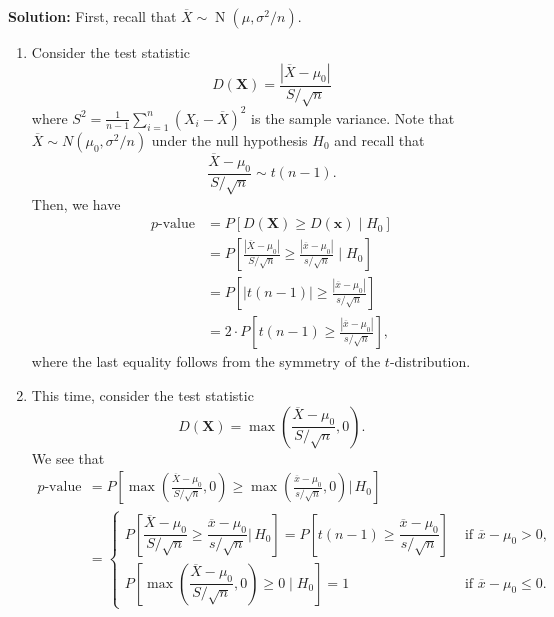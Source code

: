 \documentclass[10pt]{article}
\DeclareMathOperator{\Nor}{N}
\theoremstyle{newstyle}
\begin{document}
{\color{blue}
{\bf Solution:} First, recall that $\overline X \sim \Nor(\mu, \sigma^2/n)$. 
\begin{enumerate}[(1)]
    \item Consider the test statistic 
    \[ D(\mathbf X) = \frac{|\overline X - \mu_0|}{S/\sqrt n} \]
    where $S^2 = \frac1{n-1} \sum_{i=1}^n (X_i - \overline X)^2$ is the sample variance. 
    Note that $\overline X \sim N(\mu_0, \sigma^2/n)$ under the null hypothesis $H_0$ and 
    recall that 
    \[ \frac{\overline X - \mu_0}{S/\sqrt n} \sim t(n-1). \]
    Then, we have 
    \begin{align*}
        \text{$p$-value} 
        &= P[D(\mathbf X) \geq D(\mathbf x) \mid H_0] \\
        &= P \left[ \frac{|\overline X - \mu_0|}{S/\sqrt n} \geq 
        \frac{|\overline x - \mu_0|}{s/\sqrt n} \; \bigg| \; H_0 \right] \\
        &= P \left[ |t(n-1)| \geq \frac{|\overline x - \mu_0|}{s/\sqrt n} \right] \\
        &= 2 \cdot P \left[ t(n-1) \geq \frac{|\overline x - \mu_0|}{s/\sqrt n} \right],
    \end{align*}
    where the last equality follows from the symmetry of the $t$-distribution. 
    
    \item This time, consider the test statistic 
    \[ D(\mathbf X) = \max\left( \frac{\overline X - \mu_0}{S/\sqrt n}, 0 \right). \]
    We see that 
    \begin{align*}
        \text{$p$-value} 
        &= P \left[ \max\left( \frac{\overline X - \mu_0}{S/\sqrt n}, 0\right) 
        \geq \max\left( \frac{\overline x - \mu_0}{s/\sqrt n}, 0 \right) \Bigg|\, H_0 \right] \\
        &= \begin{cases} P \left[ \dfrac{\overline X - \mu_0}{S/\sqrt n} \geq 
        \dfrac{\overline x - \mu_0}{s/\sqrt n} \Bigg|\, H_0 \right] = 
        P\left[ t(n-1) \geq \dfrac{\overline x - \mu_0}{s/\sqrt n} \right] & \text{ if $\overline x - 
        \mu_0 > 0$,} \\[10pt]
        P\left[ \max\left( \dfrac{\overline X - \mu_0}{S/\sqrt n}, 0 \right) \geq 0 
        \;\Bigg|\;H_0 \right] = 1 & \text{ if $\overline x - \mu_0 \leq 0.$} \end{cases}
    \end{align*}
    

\end{enumerate}}
\end{document}
